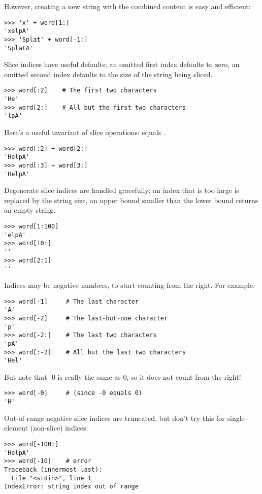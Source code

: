\documentclass{manual}
\begin{document}
However, creating a new string with the combined content is easy and
efficient:

\begin{verbatim}
>>> 'x' + word[1:]
'xelpA'
>>> 'Splat' + word[-1:]
'SplatA'
\end{verbatim}

Slice indices have useful defaults; an omitted first index defaults to
zero, an omitted second index defaults to the size of the string being
sliced.

\begin{verbatim}
>>> word[:2]    # The first two characters
'He'
>>> word[2:]    # All but the first two characters
'lpA'
\end{verbatim}

Here's a useful invariant of slice operations:
 equals .

\begin{verbatim}
>>> word[:2] + word[2:]
'HelpA'
>>> word[:3] + word[3:]
'HelpA'
\end{verbatim}

Degenerate slice indices are handled gracefully: an index that is too
large is replaced by the string size, an upper bound smaller than the
lower bound returns an empty string.

\begin{verbatim}
>>> word[1:100]
'elpA'
>>> word[10:]
''
>>> word[2:1]
''
\end{verbatim}

Indices may be negative numbers, to start counting from the right.
For example:

\begin{verbatim}
>>> word[-1]     # The last character
'A'
>>> word[-2]     # The last-but-one character
'p'
>>> word[-2:]    # The last two characters
'pA'
>>> word[:-2]    # All but the last two characters
'Hel'
\end{verbatim}

But note that -0 is really the same as 0, so it does not count from
the right!

\begin{verbatim}
>>> word[-0]     # (since -0 equals 0)
'H'
\end{verbatim}

Out-of-range negative slice indices are truncated, but don't try this
for single-element (non-slice) indices:

\begin{verbatim}
>>> word[-100:]
'HelpA'
>>> word[-10]    # error
Traceback (innermost last):
  File "<stdin>", line 1
IndexError: string index out of range
\end{verbatim}
\end{document}
